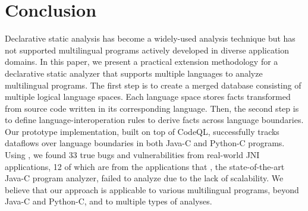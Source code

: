 \section{Conclusion}\label{sec:conclude}
Declarative static analysis has become a widely-used analysis technique but has
not supported multilingual programs actively developed in diverse application
domains.  In this paper, we present a practical extension methodology for a
declarative static analyzer that supports multiple languages to analyze
multilingual programs.  The first step is to create a merged database
consisting of multiple logical language spaces. Each language space stores
facts transformed from source code written in its corresponding language.
Then, the second step is to define language-interoperation rules to derive
facts across language boundaries.  Our prototype implementation, \ours built on
top of CodeQL, successfully tracks dataflows over language boundaries in both
Java-C and Python-C programs.  Using \ours, we found 33 true bugs and
vulnerabilities from real-world JNI applications, 12 of which are from the
applications that \lees, the state-of-the-art Java-C program analyzer, failed
to analyze due to the lack of scalability.  We believe that our approach is
applicable to various multilingual programs, beyond Java-C and Python-C, and to
multiple types of analyses.
